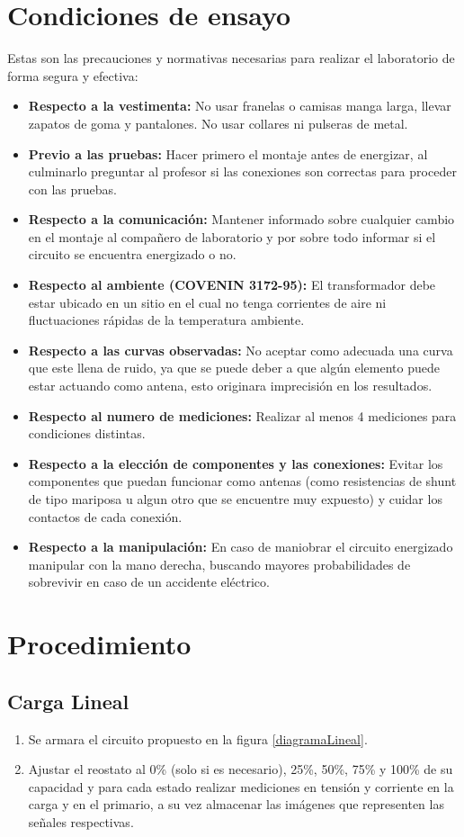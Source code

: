 \documentclass[11pt,letterpaper]{article}     %
\begin{document}
\section{Condiciones de ensayo}
Estas son las precauciones y normativas necesarias para realizar el laboratorio de forma segura y efectiva: 
\begin{itemize}
    \item \textbf{Respecto a la  vestimenta:} No usar franelas o camisas manga larga, llevar zapatos de goma y pantalones. No usar collares ni pulseras de metal.
    \item \textbf{Previo a las pruebas:} Hacer primero el montaje antes de energizar, al culminarlo preguntar al profesor si las conexiones son correctas para proceder con las pruebas.
    \item \textbf{Respecto a la comunicación:} Mantener informado sobre cualquier cambio en el montaje al compañero de laboratorio y por sobre todo informar si el circuito se encuentra energizado o no.
    \item \textbf{Respecto al ambiente (COVENIN 3172-95):} El transformador debe estar ubicado en un sitio en el cual no tenga corrientes de aire ni fluctuaciones rápidas de la temperatura ambiente.
	\item \textbf{Respecto a las curvas observadas:} No aceptar como adecuada una curva que este llena de ruido, ya que se puede deber a que algún elemento puede estar actuando como antena, esto originara imprecisión en los resultados.
	\item \textbf{Respecto al numero de mediciones:}
	Realizar al menos 4 mediciones para condiciones distintas.
	\item \textbf{Respecto a la elección de componentes y las conexiones:} Evitar los componentes que puedan funcionar como antenas (como resistencias de shunt de tipo mariposa u algun otro que se encuentre muy expuesto) y cuidar los contactos de cada conexión.
    \item \textbf{Respecto a la manipulación:} En caso de maniobrar el circuito energizado manipular con la mano derecha, buscando mayores probabilidades de sobrevivir en caso de un accidente eléctrico.
\end{itemize}
\section{Procedimiento}
\subsection{Carga Lineal}
\begin{enumerate}
	\item Se armara el circuito propuesto en la figura \ref{diagramaLineal}.
	\item Ajustar el reostato al 0\% (solo si es necesario), 25\%, 50\%, 75\% y 100\% de su capacidad y para cada estado realizar mediciones en tensión y corriente en la carga y en el primario, a su vez almacenar las imágenes que representen las señales respectivas. 
\end{enumerate}
\end{document}
